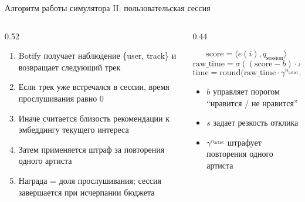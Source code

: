 \documentclass[11pt,aspectratio=169,handout]{beamer}
\newcommand{\code}[1]{\textsf{#1}}
\begin{document}
\begin{frame}{Алгоритм работы симулятора II: пользовательская сессия}

\begin{columns}[T]
\begin{column}{0.52\textwidth}
\footnotesize
\begin{enumerate}
\item Botify получает наблюдение \code{\{user, track\}} и возвращает следующий трек
\item Если трек уже встречался в сессии, время прослушивания равно $0$
\item Иначе считается близость рекомендации к эмбеддингу текущего интереса
\item Затем применяется штраф за повторения одного артиста
\item Награда = доля прослушивания; сессия завершается при исчерпании бюджета
\end{enumerate}
\end{column}

\begin{column}{0.44\textwidth}
\begin{tcolorbox}[colback=info!5,colframe=info!80,title=Формула реакции]
\footnotesize
\[
\text{score} = \langle e(i), q_{\text{session}} \rangle
\]
\[
\text{raw\_time} = \sigma((\text{score} - b) \cdot s)
\]
\[
\text{time} = \mathrm{round}\bigl(\text{raw\_time} \cdot \gamma^{n_{\text{artist}}}, 2\bigr)
\]

\begin{itemize}
\item $b$ управляет порогом ``нравится / не нравится''
\item $s$ задает резкость отклика
\item $\gamma^{n_{\text{artist}}}$ штрафует повторения одного артиста
\end{itemize}
\end{tcolorbox}
\end{column}
\end{columns}

\end{frame}
\end{document}
